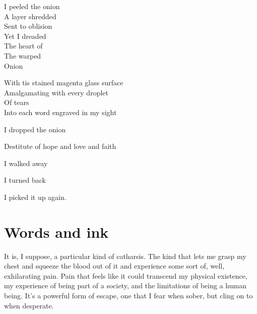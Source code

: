 \documentclass[parskip=full,12pt,oneside,openany,a5paper,numbers=endperiod]{scrbook}
\begin{document}
I peeled the onion\\
A layer shredded\\
Sent to oblision\\
Yet I dreaded\\
The heart of\\
The warped\\
Onion

With tis stained magenta glass surface\\
Amalgamating with every droplet\\
Of tears\\
Into each word engraved in my sight

I dropped the onion

Destitute of hope and love and faith

I walked away

I turned back

I picked it up again.

\chapter{Words and ink}

It is, I suppose, a particular kind of catharsis. The kind that lets me grasp
my chest and squeeze the blood out of it and experience some sort of, well,
exhilarating pain. Pain that feels like it could transcend my physical
existence, my experience of being part of a society, and the limitations of
being a human being. It's a powerful form of escape, one that I fear when
sober, but cling on to when desperate.
\end{document}
